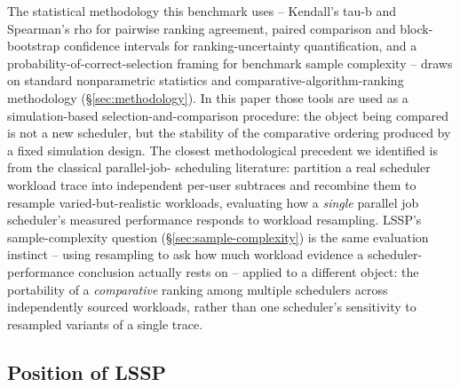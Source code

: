 The statistical methodology this benchmark uses -- Kendall's tau-b and
Spearman's rho for pairwise ranking agreement, paired comparison and
block-bootstrap confidence intervals for ranking-uncertainty
quantification, and a probability-of-correct-selection framing for
benchmark sample complexity -- draws on standard nonparametric statistics
and comparative-algorithm-ranking methodology (\S\ref{sec:methodology}).
In this paper those tools are used as a simulation-based
selection-and-comparison procedure: the object being compared is not a new
scheduler, but the stability of the comparative ordering produced by a
fixed simulation design. The closest
methodological precedent we identified is from the classical parallel-job-
scheduling literature: \citet{zakay2014resampling} partition a real
scheduler workload trace into independent per-user subtraces and recombine
them to resample varied-but-realistic workloads, evaluating how a
\emph{single} parallel job scheduler's measured performance responds to
workload resampling. LSSP's sample-complexity question
(\S\ref{sec:sample-complexity}) is the same evaluation instinct --
using resampling to ask how much workload evidence a scheduler-performance
conclusion actually rests on -- applied to a different object: the
portability of a \emph{comparative} ranking among multiple schedulers
across independently sourced workloads, rather than one scheduler's
sensitivity to resampled variants of a single trace.

\subsection{Position of LSSP}
\label{sec:related-position}

